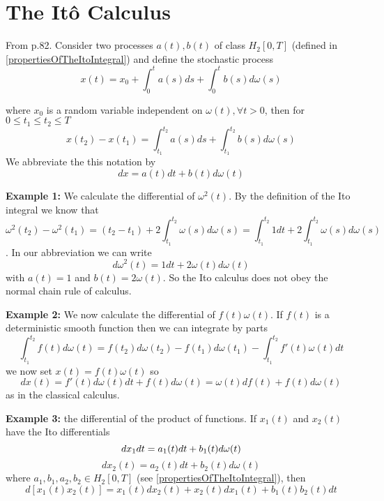 \documentclass[12pt]{report}
\begin{document}
\section{The It\^{o} Calculus}
From \cite{schuss2009theory} p.82. Consider two processes $a(t),b(t)$ of class $H_2[0,T]$ (defined in \ref{propertiesOfTheItoIntegral}) and define the stochastic process
\begin{equation*}
x(t) = x_0 + \int_0^t a(s)ds + \int_0^t b(s)d\omega(s)
\end{equation*}

where $x_0$ is a random variable independent on $\omega(t),\forall t>0$, then for $0\leq t_1\leq t_2 \leq T$
\begin{equation*}
x(t_2)-x(t_1)=\int_{t_1}^{t_2}a(s)ds +\int_{t_1}^{t_2}b(s)d\omega(s)
\end{equation*}
We abbreviate the this notation by 
\begin{equation*}
dx=a(t)dt+b(t)d\omega(t)
\end{equation*}

\textbf{Example 1:} We calculate the differential of $\omega^2(t)$. By the definition of the Ito integral we know that 
\begin{equation*}
\omega^2(t_2)-\omega^2(t_1)=(t_2-t_1)+2\int_{t_1}^{t_2}\omega(s)d\omega(s)=\int_{t_1}^{t_2}1dt+2\int_{t_1}^{t_2}\omega(s)d\omega(s)
\end{equation*}. 
In our abbreviation we can write 
\begin{equation*}
d\omega^2(t) = 1dt+2\omega(t)d\omega(t)
\end{equation*}
with $a(t)=1$ and $b(t)=2\omega(t)$. So the Ito calculus does not obey the normal chain rule of calculus.

\textbf{Example 2:} We now calculate the differential of $f(t)\omega(t)$. If $f(t)$ is a deterministic smooth function then we can integrate by parts
\begin{equation*}
\int_{t_1}^{t_2}f(t)d\omega(t)= f(t_2)d\omega(t_2)-f(t_1)d\omega(t_1)-\int_{t_1}^{t_2}f'(t)\omega(t)dt
\end{equation*}
we now set $x(t)= f(t)\omega(t)$ so 
\begin{equation*}
dx(t) = f'(t)d\omega(t)dt+f(t)d\omega(t)=\omega(t)df(t)+f(t)d\omega(t)
\end{equation*}
as in the classical calculus. 

\textbf{Example 3:} the differential of the product of functions. If $x_1(t)$ and $x_2(t)$ have the Ito differentials
\begin{equation*}
dx_1dt = a_1(t)dt +b_1(t)d\omega(t)\\
\end{equation*}
\begin{equation*}
dx_2(t) =a_2(t)dt+b_2(t)d\omega(t) 
\end{equation*}
where $a_1,b_1,a_2,b_2\in H_2[0,T]$ (see \ref{propertiesOfTheItoIntegral}), then
\begin{equation*}
d[x_1(t)x_2(t)]= x_1(t)dx_2(t)+x_2(t)dx_1(t)+b_1(t)b_2(t)dt
\end{equation*}
\end{document}
